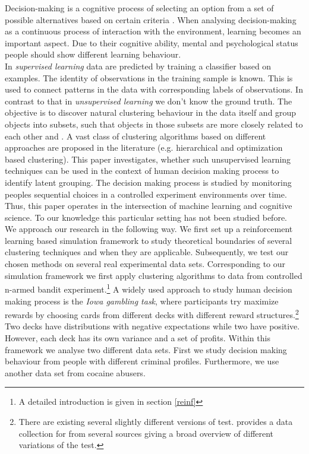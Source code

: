 \documentclass[12pt,a4paper,bibliography=totocnumbered,listof=totocnumbered]{scrartcl}
\begin{document}
Decision-making is a cognitive process of selecting an option from a set of possible alternatives based on certain criteria \cite{Wang2007}. When analysing decision-making as a continuous process of interaction with the environment, learning becomes an important aspect. Due to their cognitive ability, mental and psychological status people should show different learning behaviour.\\
In \textit{supervised learning} data are predicted by training a classifier based on examples. The identity of observations in the training sample is known. This is used to connect patterns in the data with corresponding labels of observations. In contrast to that in \textit{unsupervised learning} we don't know the ground truth. The objective is to discover natural clustering behaviour in the data itself and group objects into subsets, such that objects in those subsets are more closely related to each other \cite[page 9 et. seqq.]{Murphy2012} and \cite[page 501 et. seqq.]{hastie}. A vast class of clustering algorithms based on different approaches are proposed in the literature (e.g. hierarchical and optimization based clustering). This paper investigates, whether such unsupervised learning techniques can be used in the context of human decision making process to identify latent grouping. The decision making process is studied by monitoring peoples sequential choices in a controlled experiment environments over time. Thus, this paper operates in the intersection of machine learning and cognitive science. To our knowledge this particular setting has not been studied before.\\
We approach our research in the following way. We first set up a reinforcement learning based simulation framework to study theoretical boundaries of several clustering techniques and when they are applicable.
 Subsequently, we test our chosen methods on several  real experimental data sets. Corresponding to our simulation framework we first apply clustering algorithms to data from controlled n-armed bandit experiment.\footnote{A detailed introduction is given in section \ref{reinf}} A widely used approach to study human decision making process is the \textit{Iowa gambling task}, where participants try maximize rewards by choosing cards from different decks with different reward structures.\footnote{There are existing several slightly different versions of test. \cite{Steingroever2015} provides a data collection for from several sources giving a broad overview of different variations of the test.} Two decks have distributions with negative expectations while two have positive. However, each deck has its own variance and a set of profits.  Within this framework we analyse two different data sets. First we study decision making behaviour from people with different criminal profiles. Furthermore, we use another data set from cocaine abusers.\\
\end{document}
